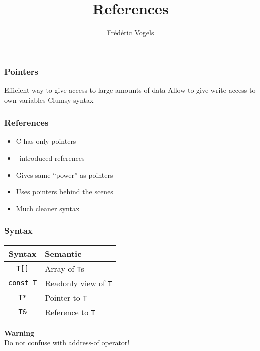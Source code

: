 \usepackage{ucll-code}
\usetikzlibrary{shadows,shapes.multipart}

\title{References}
\author{Fr\'ed\'eric Vogels}

\newcommand{\highlightbox}[2][]{
  \draw[opacity=.75,ultra thick,red,#1] ($ (#2.south west) + (-.1,-.1) $) rectangle ($ (#2.north east) + (.1,.1) $)
}




\begin{frame}
  \titlepage
\end{frame}

\begin{frame}
  \frametitle{Pointers}
  \begin{procontralist}
    \pro Efficient way to give access to large amounts of data
    \pro Allow to give write-access to own variables
    \con Clumsy syntax
  \end{procontralist}
  \vskip5mm
  \begin{overprint}

  \end{overprint}
\end{frame}

\begin{frame}
  \frametitle{References}
  \begin{itemize}
    \item C has only pointers
    \item \cpp\ introduced references
    \item Gives same ``power'' as pointers
    \item Uses pointers behind the scenes
    \item Much cleaner syntax
  \end{itemize}
\end{frame}

\begin{frame}
  \frametitle{Syntax}
  \begin{center}
    \begin{tabular}{cl}
      \textbf{Syntax}       & \textbf{Semantic} \\
      \toprule
      \texttt{T[]}          & Array of \texttt{T}s \\
      \texttt{const T}      & Readonly view of \texttt{T} \\
      \texttt{T*}           & Pointer to \texttt{T} \\
      \alert{\texttt{T\&}}  & \alert{Reference to \texttt{T}} \\
    \end{tabular}
  \end{center}
  \begin{framed}
    \begin{center} \Large
      \textbf{Warning} \\[2mm]
      Do not confuse with address-of operator!
    \end{center}
  \end{framed}
\end{frame}

